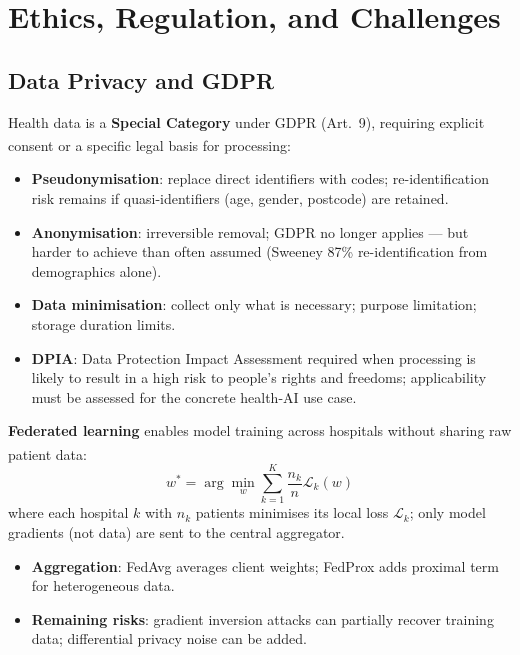 \section{Ethics, Regulation, and Challenges}

\subsection{Data Privacy and GDPR}

\begin{tcbitemize}[ skin=sectionraster ]
    \tcbitem[title={Health Data Sensitivity and GDPR}, raster multicolumn=3]
    Health data is a \textbf{Special Category} under GDPR (Art.~9), requiring explicit consent or a specific legal basis for processing\textsuperscript{\cite[][pp.~89--110]{itgovernanceprivacyteamEUGDPR2020}}:
    \begin{itemize}
        \item \textbf{Pseudonymisation}: replace direct identifiers with codes; re-identification risk remains if quasi-identifiers (age, gender, postcode) are retained.
        \item \textbf{Anonymisation}: irreversible removal; GDPR no longer applies — but harder to achieve than often assumed (Sweeney 87\% re-identification from demographics alone).
        \item \textbf{Data minimisation}: collect only what is necessary; purpose limitation; storage duration limits.
        \item \textbf{DPIA}: Data Protection Impact Assessment required when processing is likely to result in a high risk to people's rights and freedoms; applicability must be assessed for the concrete health-AI use case.
    \end{itemize}

    \tcbitem[title={Federated Learning for Healthcare}, raster multicolumn=3]
    \textbf{Federated learning} enables model training across hospitals without sharing raw patient data\textsuperscript{\cite[][p.~51]{liTwoDecadesFederated2020}}:
    \begin{equation}
        w^* = \arg\min_w \sum_{k=1}^{K} \frac{n_k}{n} \mathcal{L}_k(w)
    \end{equation}
    where each hospital $k$ with $n_k$ patients minimises its local loss $\mathcal{L}_k$; only model gradients (not data) are sent to the central aggregator.
    \begin{itemize}
        \item \textbf{Aggregation}: FedAvg averages client weights; FedProx adds proximal term for heterogeneous data.
        \item \textbf{Remaining risks}: gradient inversion attacks can partially recover training data; differential privacy noise can be added.
    \end{itemize}


\end{tcbitemize}
